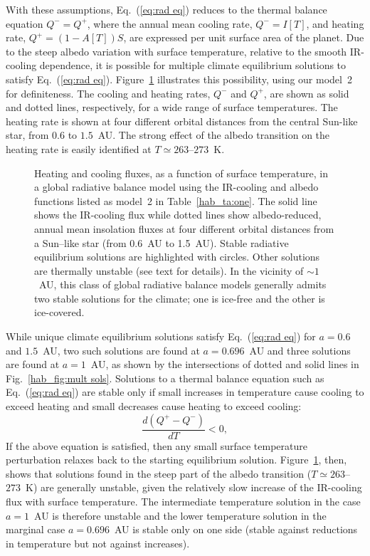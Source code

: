 With these assumptions, Eq.~(\ref{eq:rad eq}) reduces to the thermal
balance equation $Q^-=Q^+$, where the annual mean cooling rate,
$Q^-=I[T]$, and heating rate, $Q^+ = (1-A[T])S$, are expressed per
unit surface area of the planet. Due to the steep albedo variation
with surface temperature, relative to the smooth IR-cooling
dependence, it is possible for multiple climate equilibrium solutions
to satisfy Eq.~(\ref{eq:rad eq}).  Figure~\ref{hab_fig:mult sols}
illustrates this possibility, using our model~2 for definiteness. The
cooling and heating rates, $Q^-$ and $Q^+$, are shown as solid and
dotted lines, respectively, for a wide range of surface
temperatures. The heating rate is shown at four different orbital
distances from the central Sun-like star, from $0.6$ to $1.5$~AU. The
strong effect of the albedo transition on the heating rate is easily
identified at $T \simeq 263$--$273$~K.
\begin{figure}[p]
\caption[Heating and cooling fluxes, as functions of surface
temperature.]{Heating and cooling fluxes, as a function of surface
temperature, in a global radiative balance model using the IR-cooling
and albedo functions listed as model~2 in Table~\ref{hab_ta:one}.  The
solid line shows the IR-cooling flux while dotted lines show
albedo-reduced, annual mean insolation fluxes at four different
orbital distances from a Sun--like star (from 0.6~AU to 1.5~AU).
Stable radiative equilibrium solutions are highlighted with
circles. Other solutions are thermally unstable (see text for
details). In the vicinity of $\sim 1$~AU, this class of global
radiative balance models generally admits two stable solutions for the
climate; one is ice-free and the other is ice-covered.}
\label{hab_fig:mult sols}
\end{figure}
\afterpage{\clearpage}

While unique climate equilibrium solutions satisfy Eq.~(\ref{eq:rad
eq}) for $a = 0.6$ and $1.5$~AU, two such solutions are found at $a =
0.696$~AU and three solutions are found at $a = 1$~AU, as shown by the
intersections of dotted and solid lines in Fig.~\ref{hab_fig:mult
sols}. Solutions to a thermal balance equation such as
Eq.~(\ref{eq:rad eq}) are stable only if {small increases in
temperature cause cooling to exceed heating and small decreases cause
heating to exceed cooling:}
\begin{equation}
\frac{d \left( Q^+ -Q^- \right)}{dT} <0,
\end{equation}
If the above equation is satisfied, then any small surface temperature
perturbation relaxes back to the starting equilibrium
solution. Figure~\ref{hab_fig:mult sols}, then, shows that solutions
found in the steep part of the albedo transition ($T \simeq
263$--$273$~K) are generally unstable, given the relatively slow
increase of the IR-cooling flux with surface temperature.  The
intermediate temperature solution in the case $a = 1$~AU is therefore
unstable and the lower temperature solution in the marginal case $a =
0.696$~AU is stable only on one side (stable against reductions in
temperature but not against increases).

